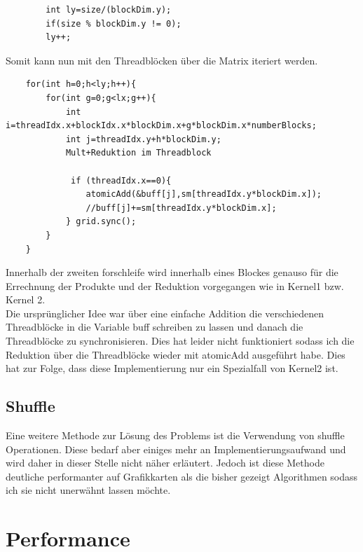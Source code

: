 \documentclass[10pt,a4paper]{article}
\begin{document}
 	\begin{lstlisting}
 		int ly=size/(blockDim.y);
 		if(size % blockDim.y != 0);
 		ly++;        
 	\end{lstlisting}
 	Somit kann nun mit den Threadblöcken über die Matrix iteriert werden.
 	\begin{lstlisting}
 	for(int h=0;h<ly;h++){
 		for(int g=0;g<lx;g++){
 			int i=threadIdx.x+blockIdx.x*blockDim.x+g*blockDim.x*numberBlocks;
 			int j=threadIdx.y+h*blockDim.y;   
 			Mult+Reduktion im Threadblock
 			
 			 if (threadIdx.x==0){
 				atomicAdd(&buff[j],sm[threadIdx.y*blockDim.x]);
 				//buff[j]+=sm[threadIdx.y*blockDim.x];
 			} grid.sync();
 		}
 	}
 	\end{lstlisting}
 	Innerhalb der zweiten forschleife wird innerhalb eines Blockes genauso für die Errechnung der Produkte und der Reduktion vorgegangen wie in Kernel1 bzw. Kernel 2.\\
 	Die ursprünglicher Idee war über eine einfache Addition die verschiedenen Threadblöcke in die Variable buff schreiben zu lassen und danach die Threadblöcke zu synchronisieren. Dies hat leider nicht funktioniert sodass ich die Reduktion über die Threadblöcke wieder mit atomicAdd ausgeführt habe. Dies hat zur Folge, dass diese Implementierung nur ein Spezialfall von Kernel2 ist.
	 \subsection{Shuffle}
	 Eine weitere Methode zur Lösung des Problems ist die Verwendung von shuffle Operationen. Diese bedarf aber einiges mehr an Implementierungsaufwand und wird daher in dieser Stelle nicht näher erläutert. Jedoch ist diese Methode deutliche performanter auf Grafikkarten als die bisher gezeigt Algorithmen sodass ich sie nicht unerwähnt lassen möchte.

	 \section{Performance}
\end{document}
